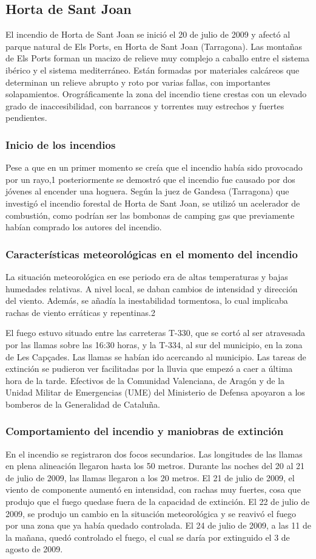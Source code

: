 \subsection{Horta de Sant Joan}
El incendio de Horta de Sant Joan se inició el 20 de julio de 2009 y afectó al parque natural de Els Ports, en Horta de Sant Joan (Tarragona). Las montañas de Els Ports forman un macizo de relieve muy complejo a caballo entre el sistema ibérico y el sistema mediterráneo. Están formadas por materiales calcáreos que determinan un relieve abrupto y roto por varias fallas, con importantes solapamientos. Orográficamente la zona del incendio tiene crestas con un elevado grado de inaccesibilidad, con barrancos y torrentes muy estrechos y fuertes pendientes. 
\subsubsection{Inicio de los incendios}
Pese a que en un primer momento se creía que el incendio había sido provocado por un rayo,1​ posteriormente se demostró que el incendio fue causado por dos jóvenes al encender una hoguera. Según la juez de Gandesa (Tarragona) que investigó el incendio forestal de Horta de Sant Joan, se utilizó un acelerador de combustión, como podrían ser las bombonas de camping gas que previamente habían comprado los autores del incendio. 
\subsubsection{Características meteorológicas en el momento del incendio}
La situación meteorológica en ese periodo era de altas temperaturas y bajas humedades relativas. A nivel local, se daban cambios de intensidad y dirección del viento. Además, se añadía la inestabilidad tormentosa, lo cual implicaba rachas de viento erráticas y repentinas.2​


El fuego estuvo situado entre las carreteras T-330, que se cortó al ser atravesada por las llamas sobre las 16:30 horas, y la T-334, al sur del municipio, en la zona de Les Capçades. Las llamas se habían ido acercando al municipio. Las tareas de extinción se pudieron ver facilitadas por la lluvia que empezó a caer a última hora de la tarde. Efectivos de la Comunidad Valenciana, de Aragón y de la Unidad Militar de Emergencias (UME) del Ministerio de Defensa apoyaron a los bomberos de la Generalidad de Cataluña. 
\subsubsection{Comportamiento del incendio y maniobras de extinción}
En el incendio se registraron dos focos secundarios. Las longitudes de las llamas en plena alineación llegaron hasta los 50 metros. Durante las noches del 20 al 21 de julio de 2009, las llamas llegaron a los 20 metros. El 21 de julio de 2009, el viento de componente aumentó en intensidad, con rachas muy fuertes, cosa que produjo que el fuego quedase fuera de la capacidad de extinción. El 22 de julio de 2009, se produjo un cambio en la situación meteorológica y se reavivó el fuego por una zona que ya había quedado controlada. El 24 de julio de 2009, a las 11 de la mañana, quedó controlado el fuego, el cual se daría por extinguido el 3 de agosto de 2009. 
